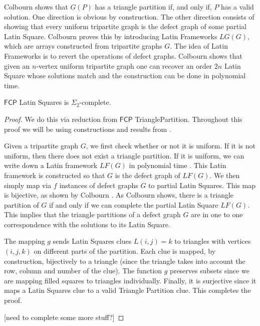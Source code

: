 \documentclass[runningheads,a4paper]{llncs}
\begin{document}
Colbourn \cite{colbourn1984complexity} shows that $G(P)$ has a triangle partition if, and only if, $P$ has a valid solution. One direction is obvious by construction. The other direction  consists of showing that every uniform tripartite graph is the defect graph of some partial Latin Square. Colbourn \cite{colbourn1984complexity} proves this by introducing Latin Frameworks $LG(G)$, which are arrays constructed from tripartite graphs $G$. The idea of Latin Frameworks is to revert the operations of defect graphs. Colbourn shows  that given an $n$-vertex uniform tripartite graph one can recover an order $2n$ Latin Square whose solutions match and the construction can be done in polynomial time. 

\begin{theorem}
$\mathsf{FCP}$ Latin Squares is $\Sigma_2$-complete.
\end{theorem}

\begin{proof}
We do this via reduction from $\mathsf{FCP}$ TrianglePartition. Throughout this proof we will be using constructions and results from \cite{colbourn1984complexity}.

Given a tripartite graph $G$, we first check whether or not it is uniform. If it is not uniform, then there does not exist a triangle partition. If it is uniform, we can write down a Latin framework $LF(G)$ in polynomial time \cite{colbourn1984complexity}. This Latin framework is constructed so that $G$ is the defect graph of $LF(G)$. We then simply map via $f$ instances of defect graphs $G$ to partial Latin Squares. This map is bijective, as shown by Colbourn \cite{colbourn1984complexity}. As Colbourn shows, there is a triangle partition of $G$ if and only if we can complete the partial Latin Square $LF(G)$. This implies that the triangle partitions of a defect graph $G$ are in one to one correspondence with the solutions to its Latin Square. 

The mapping $g$ sends Latin Squares clues $L(i,j) = k$ to triangles with vertices $(i,j,k)$ on different parts of the partition. Each clue is mapped, by construction, bijectively to a triangle (since the triangle takes into account the row, column and number of the clue). The function $g$ preserves subsets since we are mapping filled squares to triangles individually. Finally, it is surjective since it maps a Latin Squares clue to a valid Triangle Partition clue. This completes the proof.

[need to complete some more stuff?]
\end{proof}
\end{document}
